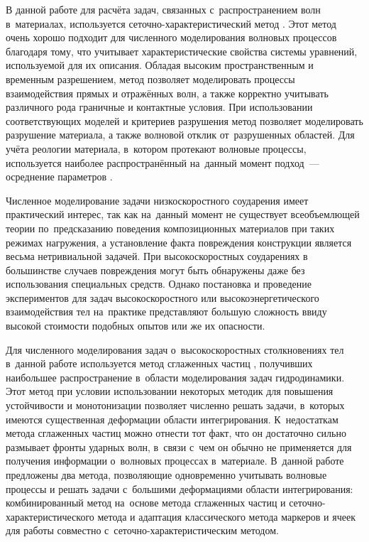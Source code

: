 \documentclass[thesis.tex]{subfiles}
\begin{document}
В данной работе для расчёта задач, связанных с~распространением волн в~материалах, используется
сеточно-характеристический метод \cite{магомедов1988схм,белоцерковский1994численное,петров1989численное,петров1986волнове,петров1984численное,холодов1984регуляризация,ермаков2013построение}.
Этот метод очень хорошо подходит для численного моделирования волновых процессов благодаря тому, что учитывает
характеристические свойства системы уравнений, используемой для их описания. Обладая высоким пространственным и
временным разрешением, метод позволяет моделировать процессы взаимодействия прямых и отражённых волн, а также корректно
учитывать различного рода граничные и контактные условия. При использовании соответствующих моделей
\cite{майнчен1967тензор} и критериев разрушения \cite{puck1969failure,hashin1973fatigue,tsai1971general,hill1979theoretical,cazacu2001generalization}
метод позволяет моделировать разрушение материала, а также волновой отклик от~разрушенных областей. Для учёта реологии
материала, в~котором протекают волновые процессы, используется наиболее распространённый на~данный момент подход~---
осреднение параметров \cite{победря1984механика,бахвалов1980осреднение,бахвалов1974осреднение}.

Численное моделирование задачи низкоскоростного соударения имеет практический интерес, так как на~данный момент не
существует всеобъемлющей теории по~предсказанию поведения композиционных материалов при таких режимах нагружения, а
установление факта повреждения конструкции является весьма нетривиальной задачей. При высокоскоростных соударениях в
большинстве случаев повреждения могут быть обнаружены даже без использования специальных средств. Однако постановка и
проведение экспериментов для задач высокоскоростного или высокоэнергетического взаимодействия тел на~практике
представляют большую сложность ввиду высокой стоимости подобных опытов или же их опасности.

Для численного моделирования задач о~высокоскоростных столкновениях тел в~данной работе используется метод сглаженных
частиц \cite{monaghan1988introduction}, получивших наибольшее распространение в~области моделирования задач
гидродинамики. Этот метод при условии использовании некоторых методик для повышения устойчивости и монотонизации
\cite{monaghan1989problem,monaghan1997sph,потапов2009диссертация,паршиков2013диссертация} позволяет численно решать
задачи, в~которых имеются существенная деформации области интегрирования. К~недостаткам метода сглаженных частиц можно
отнести тот факт, что он достаточно сильно размывает фронты ударных волн, в~связи с~чем он обычно не применяется для
получения информации о~волновых процессах в~материале. В~данной работе предложены два метода, позволяющие одновременно
учитывать волновые процессы и решать задачи с~большими деформациями области интегрирования: комбинированный метод
\cite{петров2015комбинированный,васюков2014комбинирование,petrov2014combined,петров2014схм} на~основе метода сглаженных
частиц и сеточно-характеристического метода и адаптация классического метода маркеров и ячеек \cite{harlow1965numerical}
для работы совместно с~сеточно-характеристическим методом.
\end{document}
